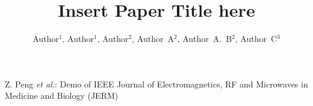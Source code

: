 \documentclass[journal,twocolumn,letterpaper]{IEEEJERM}
\begin{document}
%

\vspace{1 cm}

\title{Insert Paper Title here}

%
\author{Author$^1$, %
        Author$^1$,
        Author$^2$, %
        Author~A$^2$, %
		Author~A.~B$^2$, 
		Author~C$^3$         
}%

{Z. Peng \MakeLowercase{\textit{et al.}}: Demo of IEEE Journal of Electromagnetics, RF and Microwaves in Medicine and Biology (JERM)}
\end{document}
